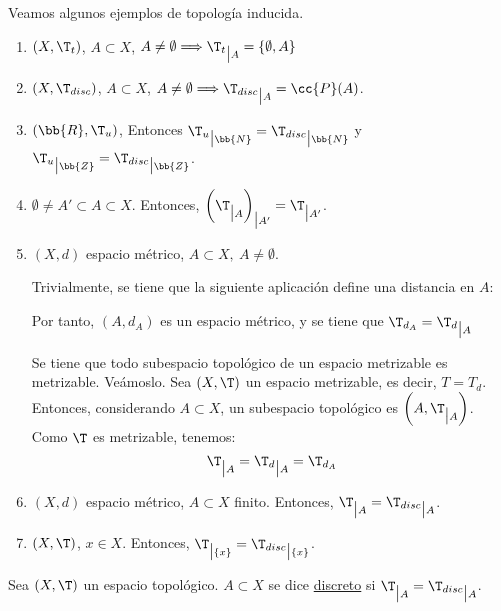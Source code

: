 \begin{ejemplo}
    Veamos algunos ejemplos de topología inducida.
    \begin{enumerate}
        \item $(X,\T_t)$, $A\subset X$, $A\neq \emptyset\Longrightarrow {\T_t}_{\big|A}=\{\emptyset,A\}$

        \item $(X,\T_{disc})$, $A\subset X$, $A\neq\emptyset \Longrightarrow {\T_{disc}}_{\big|A}=\cc{P}(A)$.

        \item $(\bb{R},\T_u)$, Entonces ${\T_u}_{\big|\bb{N}}={\T_{disc}}_{\big|\bb{N}}$ y ${\T_u}_{\big|\bb{Z}}={\T_{disc}}_{\big|\bb{Z}}$.

        \item $\emptyset\neq A'\subset A\subset X$. Entonces, $\left(\T_{\big|A}\right)_{\big|A'}=\T_{\big|A'}$.

        \item $(X,d)$ espacio métrico, $A\subset X,~A\neq \emptyset$. 
        
        Trivialmente, se tiene que la siguiente aplicación define una distancia en $A$:

        Por tanto, $(A,d_A)$ es un espacio métrico, y se tiene que $\T_{d_A}={\T_d}_{\big|A}$

        Se tiene que todo subespacio topológico de un espacio metrizable es metrizable. Veámoslo. Sea $(X,\T)$ un espacio metrizable, es decir, $T=T_d$. Entonces, considerando $A\subset X$, un subespacio topológico es $\left(A,\T_{\big| A}\right)$. Como $\T$ es metrizable, tenemos:
        \begin{equation*}
            \T_{\big| A} = {\T_d}_{\big| A} = \T_{d_A}
        \end{equation*}

        \item $(X,d)$ espacio métrico, $A\subset X$ finito. Entonces, $\T_{\big|A}={\T_{disc}}_{\big|A}$.

        \item $(X,\T)$, $x\in X$. Entonces, $\T_{\big| \{x\}}={\T_{disc}}_{\big| \{x\}}$.
    \end{enumerate}
\end{ejemplo}


\begin{definicion}
    Sea $(X,\T)$ un espacio topológico. $A\subset X$ se dice \ul{discreto} si $\T_{\big|A}={\T_{disc}}_{\big|A}$.
\end{definicion}

